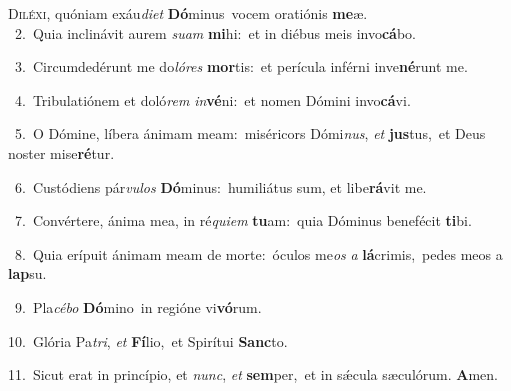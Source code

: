 \lettrine{\initial\textcolor{\initialcolor}{D}}{iléxi,} quóniam exáu\-\textit{di}\-\textit{et} \textbf{Dó}\-minus~\star vocem oratiónis \textbf{me}\-æ.\\
{\numbfont\textcolor{\numbcolor}{~2.}}~Quia inclinávit aurem \textit{su}\-\textit{am} \textbf{mi}\-hi:~\star et in diébus meis invo\-\textbf{cá}\-bo.\par
{\numbfont\textcolor{\numbcolor}{~3.}}~Circumdedérunt me do\-\textit{ló}\-\textit{res} \textbf{mor}\-tis:~\star et perícula inférni inve\-\textbf{né}\-runt me.\par
{\numbfont\textcolor{\numbcolor}{~4.}}~Tribulatiónem et doló\textit{rem} \textit{in}\-\textbf{vé}ni:~\star et nomen Dómini invo\-\textbf{cá}\-vi.\par
{\numbfont\textcolor{\numbcolor}{~5.}}~O Dómine, líbera ánimam meam:~\dagger miséricors Dómi\-\textit{nus}\-, \textit{et} \textbf{jus}\-tus,~\star et Deus noster mise\-\textbf{ré}\-tur.\par
{\numbfont\textcolor{\numbcolor}{~6.}}~Custódiens pár\-\textit{vu}\-\textit{los} \textbf{Dó}\-minus:~\star humiliátus sum, et libe\-\textbf{rá}\-vit me.\par
{\numbfont\textcolor{\numbcolor}{~7.}}~Convértere, ánima mea, in ré\-\textit{qui}\-\textit{em} \textbf{tu}\-am:~\star quia Dóminus benefécit \textbf{ti}\-bi.\par
{\numbfont\textcolor{\numbcolor}{~8.}}~Quia erípuit ánimam meam de morte:~\dagger óculos me\textit{os} \textit{a} \textbf{lá}\-crimis,~\star pedes meos a \textbf{lap}\-su.\par
{\numbfont\textcolor{\numbcolor}{~9.}}~Pla\-\textit{cé}\-\textit{bo} \textbf{Dó}\-mino~\star in regióne vi\-\textbf{vó}\-rum.\par
{\numbfont\textcolor{\numbcolor}{10.}}~Glória Pa\-\textit{tri}\-, \textit{et} \textbf{Fí}\-lio,~\star et Spirítui \textbf{Sanc}\-to.\par
{\numbfont\textcolor{\numbcolor}{11.}}~Sicut erat in princípio, et \textit{nunc}\-, \textit{et} \textbf{sem}\-per,~\star et in sǽcula sæculórum. \textbf{A}\-men.\par
